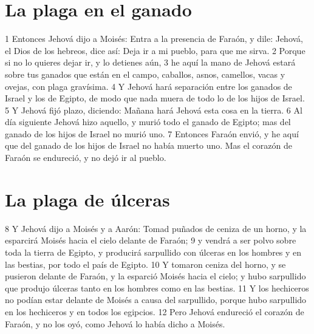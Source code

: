 \section*{La plaga en el ganado}
1 Entonces Jehová dijo a Moisés: Entra a la presencia de Faraón, y dile: Jehová, el Dios de los hebreos, dice así: Deja ir a mi pueblo, para que me sirva.
2 Porque si no lo quieres dejar ir, y lo detienes aún,
3 he aquí la mano de Jehová estará sobre tus ganados que están en el campo, caballos, asnos, camellos, vacas y ovejas, con plaga gravísima.
4 Y Jehová hará separación entre los ganados de Israel y los de Egipto, de modo que nada muera de todo lo de los hijos de Israel.
5 Y Jehová fijó plazo, diciendo: Mañana hará Jehová esta cosa en la tierra.
6 Al día siguiente Jehová hizo aquello, y murió todo el ganado de Egipto; mas del ganado de los hijos de Israel no murió uno.
7 Entonces Faraón envió, y he aquí que del ganado de los hijos de Israel no había muerto uno. Mas el corazón de Faraón se endureció, y no dejó ir al pueblo.

\section*{La plaga de úlceras}
8 Y Jehová dijo a Moisés y a Aarón: Tomad puñados de ceniza de un horno, y la esparcirá Moisés hacia el cielo delante de Faraón;
9 y vendrá a ser polvo sobre toda la tierra de Egipto, y producirá sarpullido con úlceras en los hombres y en las bestias, por todo el país de Egipto.
10 Y tomaron ceniza del horno, y se pusieron delante de Faraón, y la esparció Moisés hacia el cielo; y hubo sarpullido que produjo úlceras tanto en los hombres como en las bestias.
11 Y los hechiceros no podían estar delante de Moisés a causa del sarpullido, porque hubo sarpullido en los hechiceros y en todos los egipcios.
12 Pero Jehová endureció el corazón de Faraón, y no los oyó, como Jehová lo había dicho a Moisés.

